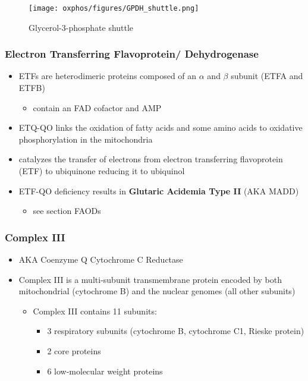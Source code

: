 \documentclass[12pt]{scrartcl}
\begin{document}
\begin{figure}[htbp]
\centering
\texttt{[image: oxphos/figures/GPDH\_shuttle.png]}
\caption[g3ps]{\label{fig:orgfb6e8e8}Glycerol-3-phosphate shuttle}
\end{figure}

\subsubsection{Electron Transferring Flavoprotein/ Dehydrogenase}
\label{sec:org34691f2}
\begin{itemize}
\item ETFs are heterodimeric proteins composed of an \(\alpha\) and \(\beta\)
subunit (ETFA and ETFB)
\begin{itemize}
\item contain an FAD cofactor and AMP
\end{itemize}
\item ETQ-QO links the oxidation of fatty acids and some amino acids to
oxidative phosphorylation in the mitochondria
\item catalyzes the transfer of electrons from electron transferring
flavoprotein (ETF) to ubiquinone reducing it to ubiquinol
\end{itemize}

{\small{}}

\begin{itemize}
\item ETF-QO deficiency results in \textbf{Glutaric Acidemia Type II} (AKA MADD)
\begin{itemize}
\item see section FAODs
\end{itemize}
\end{itemize}
\subsubsection{Complex III}
\label{sec:orgcbc39b7}
\begin{itemize}
\item AKA Coenzyme Q Cytochrome C Reductase
\item Complex III is a multi-subunit transmembrane protein encoded by both
mitochondrial (cytochrome B) and the nuclear genomes (all other
subunits)

\begin{itemize}
\item Complex III contains 11 subunits:
\begin{itemize}
\item 3 respiratory subunits (cytochrome B, cytochrome C1, Rieske protein)
\item 2 core proteins
\item 6 low-molecular weight proteins
\end{itemize}
\end{itemize}

{\small{}}
\end{itemize}
\end{document}
